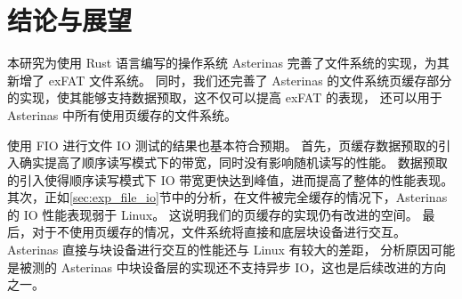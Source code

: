 
\chapter{结论与展望}
本研究为使用 Rust 语言编写的操作系统 Asterinas 完善了文件系统的实现，为其新增了 exFAT 文件系统。
同时，我们还完善了 Asterinas 的文件系统页缓存部分的实现，使其能够支持数据预取，这不仅可以提高 exFAT 的表现，
还可以用于 Asterinas 中所有使用页缓存的文件系统。

使用 FIO 进行文件 IO 测试的结果也基本符合预期。
首先，页缓存数据预取的引入确实提高了顺序读写模式下的带宽，同时没有影响随机读写的性能。
数据预取的引入使得顺序读写模式下 IO 带宽更快达到峰值，进而提高了整体的性能表现。
其次，正如\ref{sec:exp_file_io}节中的分析，在文件被完全缓存的情况下，Asterinas 的 IO 性能表现弱于 Linux。
这说明我们的页缓存的实现仍有改进的空间。
最后，对于不使用页缓存的情况，文件系统将直接和底层块设备进行交互。
Asterinas 直接与块设备进行交互的性能还与 Linux 有较大的差距，
分析原因可能是被测的 Asterinas 中块设备层的实现还不支持异步 IO，这也是后续改进的方向之一。

